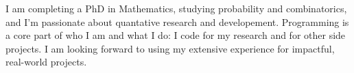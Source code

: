\documentclass[11pt, letterpaper]{awesome-cv} %
\begin{document}
\makecvheader %



{\fontsize{9pt}{1em}\bodyfont\color{darktext} I am completing a PhD in Mathematics, studying probability and combinatorics, and I'm passionate about quantative research and developement. Programming is a core part of who I am and what I do: I code for my research and for other side projects. I am looking forward to using my extensive experience for impactful, real-world projects.}




% 

% 

% 
\end{document}
